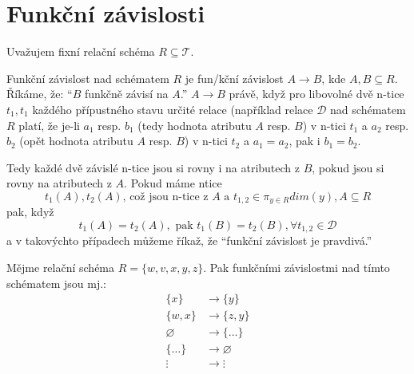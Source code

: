 \section{Funkční závislosti}
Uvažujem fixní relační schéma $R \subseteq \mathcal{T}$.
\begin{uptheorem}
Funkční závislost nad schématem $R$ je fun\-/kční závislost $A \to B$, kde $A, B \subseteq R$. Říkáme, že: \enquote{$B$ funkčně závisí na $A$.} $A \to B$ právě, když pro libovolné dvě n-tice $t_{1}, t_{1}$ každého přípustného stavu určité relace (například relace $\mathcal{D}$ nad schématem $R$ platí, že je-li $a_{1}$ resp. $b_{1}$ (tedy  hodnota atributu $A$ resp. $B$) v n-tici $t_{1}$ a $a_{2}$ resp. $b_{2}$ (opět hodnota atributu $A$ resp. $B$) v n-tici $t_{2}$ a $a_{1} = a_{2}$, pak i $b_{1} = b_{2}$.

Tedy každé dvě závislé n-tice jsou si rovny i na atributech z $B$, pokud jsou si rovny na atributech z $A$. Pokud máme ntice
$$
t_{1}(A), t_{2}(A) \text{, což jsou n-tice z } A \text{ a } t_{1, 2} \in \pi_{y \in R} dim(y), A \subseteq R
$$
pak, když
$$
t_{1}(A) = t_{2}(A), \text{ pak } t_{1}(B) = t_{2}(B), \forall t_{1,2} \in \mathcal{D}
$$
a v takovýchto případech můžeme říkaž, že \enquote{funkční závislost je pravdivá.}
\end{uptheorem}

\begin{upexample}
Mějme relační schéma $R = \{ w, v, x, y, z \}$. Pak funkčními závislostmi nad tímto schématem jsou mj.:
\begin{align*}
\{ x \} &\to \{ y \} \\
\{ w, x \} &\to \{ z, y \} \\
\varnothing &\to \{ \ldots \} \\
\{ \ldots \} &\to \varnothing \\
\vdots &\to \vdots
\end{align*}
\end{upexample}

